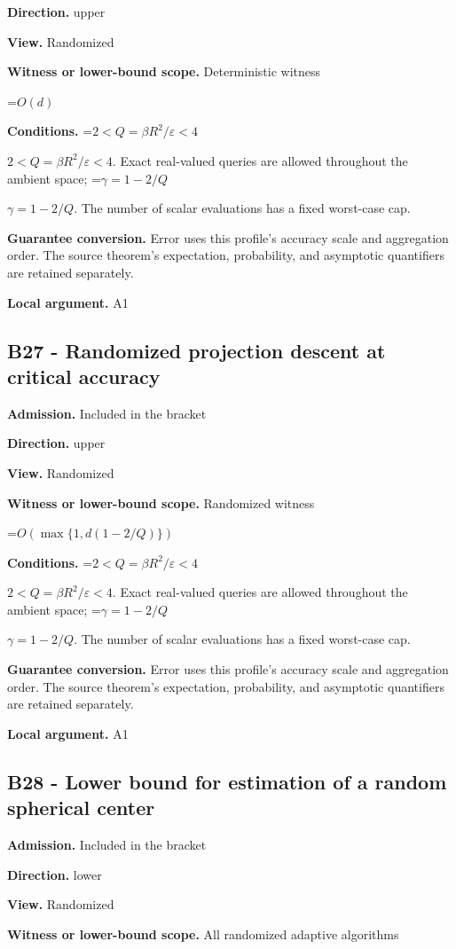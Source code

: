 \documentclass[10pt,a4paper]{article}
\newcommand{\AtlasMath}[1]{\par\begingroup\centering\setbox0=\hbox{$\displaystyle #1$}\ifdim\wd0>1.4\linewidth\typeout{ATLAS WIDE FORMULA: \the\wd0}\fi\ifdim\wd0>\linewidth\resizebox{\linewidth}{!}{\box0}\else\box0\fi\par\endgroup}
\newcommand{\AtlasInlineMath}[1]{\begingroup\setbox0=\hbox{$#1$}\ifdim\wd0>.4\linewidth\endgroup\AtlasMath{#1}\else\endgroup$#1$\fi}
\begin{document}
\textbf{Direction.} upper

\textbf{View.} Randomized

\textbf{Witness or lower-bound scope.} Deterministic witness

\AtlasMath{O(d)}
\textbf{Conditions.} \AtlasInlineMath{2<Q=\beta R^2/\varepsilon<4}. Exact real-valued queries are allowed throughout the ambient space; \AtlasInlineMath{\gamma=1-2/Q}. The number of scalar evaluations has a fixed worst-case cap.

\textbf{Guarantee conversion.} Error uses this profile's accuracy scale and aggregation order. The source theorem's expectation, probability, and asymptotic quantifiers are retained separately.

\textbf{Local argument.} A1

\subsection{B27 - Randomized projection descent at critical accuracy}
\textbf{Admission.} Included in the bracket

\textbf{Direction.} upper

\textbf{View.} Randomized

\textbf{Witness or lower-bound scope.} Randomized witness

\AtlasMath{O(\max\{1,d(1-2/Q)\})}
\textbf{Conditions.} \AtlasInlineMath{2<Q=\beta R^2/\varepsilon<4}. Exact real-valued queries are allowed throughout the ambient space; \AtlasInlineMath{\gamma=1-2/Q}. The number of scalar evaluations has a fixed worst-case cap.

\textbf{Guarantee conversion.} Error uses this profile's accuracy scale and aggregation order. The source theorem's expectation, probability, and asymptotic quantifiers are retained separately.

\textbf{Local argument.} A1

\subsection{B28 - Lower bound for estimation of a random spherical center}
\textbf{Admission.} Included in the bracket

\textbf{Direction.} lower

\textbf{View.} Randomized

\textbf{Witness or lower-bound scope.} All randomized adaptive algorithms
\end{document}
